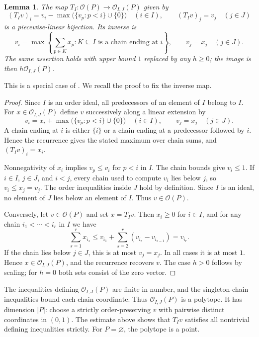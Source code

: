 \documentclass[a4paper,12pt]{amsart}
\newtheorem{lemma}[theorem]{Lemma}
\theoremstyle{definition}
\theoremstyle{remark}
\newcommand{\OO}{\mathcal O}
\begin{document}
\begin{lemma}\label{lem:transfer}
The map $T_I:\OO(P)\to\OO_{I,J}(P)$ given by
\[
 (T_Iv)_i=v_i-\max\bigl(\{v_p:p<i\}\cup\{0\}\bigr)\quad(i\in I),  \qquad  (T_Iv)_j=v_j\quad(j\in J)
\]
is a piecewise-linear bijection.
Its inverse is
\[
 v_i=\max\left\{\sum_{p\in K}x_p: K\subseteq I\text{ is a chain ending at }i\right\}, \qquad v_j=x_j\quad(j\in J).
\]
The same assertion holds with upper bound $1$ replaced by any $h\geq0$; the image is then $h\OO_{I,J}(P)$.
\end{lemma}

This is a special case of \cite[Theorem~2.1]{Fan+20}.
We recall the proof to fix the inverse map.

\begin{proof}
Since $I$ is an order ideal, all predecessors of an element of $I$ belong to $I$.
For $x\in\OO_{I,J}(P)$ define $v$ successively along a linear extension by
\[
 v_i=x_i+\max\bigl(\{v_p:p<i\}\cup\{0\}\bigr)\quad(i\in I),  \qquad v_j=x_j\quad(j\in J).
\]
A chain ending at $i$ is either $\{i\}$ or a chain ending at a predecessor followed by $i$.
Hence the recurrence gives the stated maximum over chain sums, and $(T_Iv)_i=x_i$.

Nonnegativity of $x_i$ implies $v_p\leq v_i$ for $p<i$ in $I$.
The chain bounds give $v_i\leq1$.
If $i\in I$, $j\in J$, and $i<j$, every chain used to compute $v_i$ lies below $j$, so $v_i\leq x_j=v_j$.
The order inequalities inside $J$ hold by definition.
Since $I$ is an ideal, no element of $J$ lies below an element of $I$.
Thus $v\in\OO(P)$.

Conversely, let $v\in\OO(P)$ and set $x=T_Iv$.
Then $x_i\geq0$ for $i\in I$, and for any chain $i_1<\cdots<i_r$ in $I$ we have
\[
 \sum_{s=1}^r x_{i_s}  \leq v_{i_1}+\sum_{s=2}^r(v_{i_s}-v_{i_{s-1}})  =v_{i_r}.
\]
If the chain lies below $j\in J$, this is at most $v_j=x_j$.
In all cases it is at most $1$.
Hence $x\in\OO_{I,J}(P)$, and the recurrence recovers $v$.
The case $h>0$ follows by scaling; for $h=0$ both sets consist of the zero vector.
\end{proof}

The inequalities defining $\OO_{I,J}(P)$ are finite in number, and the singleton-chain inequalities bound each chain coordinate.
Thus $\OO_{I,J}(P)$ is a polytope.
It has dimension $|P|$: choose a strictly order-preserving $v$ with pairwise distinct coordinates in $(0,1)$.
The estimate above shows that $T_Iv$ satisfies all nontrivial defining inequalities strictly.
For $P=\varnothing$, the polytope is a point.
\end{document}
